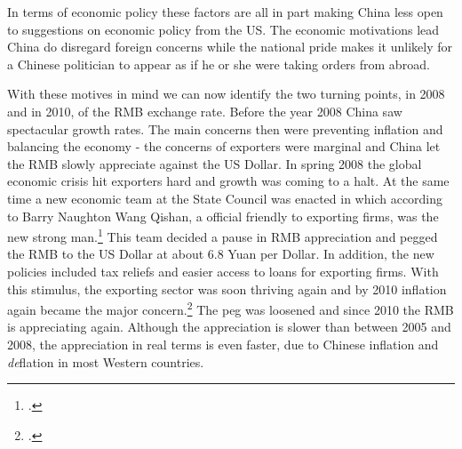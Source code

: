 In terms of economic policy these factors are all in part making China
less open to suggestions on economic policy from the US. The economic 
motivations lead China do disregard foreign concerns while the national 
pride makes it unlikely for a Chinese politician to appear as if he or 
she were taking orders from abroad.  

With these motives in mind we can now identify the two turning points, 
in 2008 and in 2010, of the RMB exchange rate. Before the year 2008 
China saw spectacular growth rates.  The main concerns then were 
preventing inflation and balancing the economy - the concerns of 
exporters were marginal and China let the RMB slowly appreciate against 
the US Dollar. In spring 2008 the global economic crisis hit exporters 
hard and growth was coming to a halt. At the same time a new economic 
team at the State Council was enacted in which according to Barry 
Naughton Wang Qishan, a official friendly to exporting firms, was the 
new strong man.\footnote{\cite{Naughton2008}.} This team decided a pause 
in RMB appreciation and pegged the RMB to the US Dollar at about 6.8 
Yuan per Dollar. In addition, the new policies included tax reliefs and 
easier access to loans for exporting firms. With this stimulus, the 
exporting sector was soon thriving again and by 2010 inflation again 
became the major concern.\footnote{\cite{Naughton2010}.} The peg was 
loosened and since 2010 the RMB is appreciating again. Although the 
appreciation is slower than between 2005 and 2008, the appreciation in 
real terms is even faster, due to Chinese inflation and \emph{de}flation 
in most Western countries.
